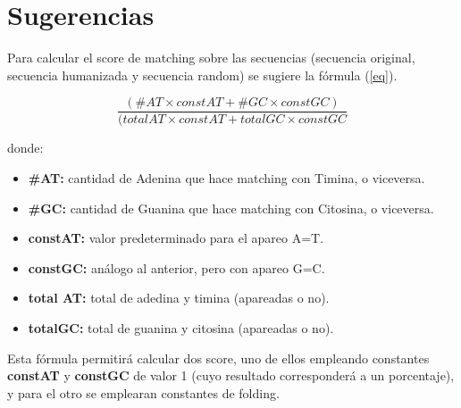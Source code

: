 \section{Sugerencias}
\label{appendix-formulates}

Para calcular el score de matching sobre las secuencias (secuencia original, secuencia humanizada y secuencia random) se sugiere la fórmula (\ref{eq}).

\begin{equation}	
	\label{eq} \frac{(\#AT \times constAT + \#GC \times constGC)}{(totalAT \times constAT + totalGC \times constGC}
\end{equation}	

\par donde:
\begin{itemize}
	\item \textbf{\#AT:} cantidad de Adenina que hace matching con Timina, o viceversa.
	\item \textbf{\#GC:} cantidad de Guanina que hace matching con Citosina, o viceversa.
	\item \textbf{constAT:} valor predeterminado para el apareo A=T.
	\item \textbf{constGC:} análogo al anterior, pero con apareo G=C.
	\item \textbf{total AT:} total de adedina y timina (apareadas o no).
	\item \textbf{totalGC:} total de guanina y citosina (apareadas o no).	
\end{itemize} 

Esta fórmula permitirá calcular dos score, uno de ellos empleando constantes \textbf{constAT} y \textbf{constGC} de valor 1 (cuyo resultado corresponderá a un porcentaje), y para el otro se emplearan constantes de folding.
